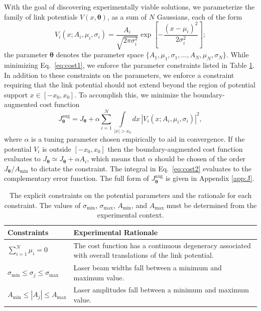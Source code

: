\documentclass[reprint, twocolumn,amsmath,amssymb,showpacs,pra,superscriptaddress,aps]{revtex4-1}
\begin{document}
With the goal of discovering experimentally viable solutions, we parameterize the family of link potentials $V(x, \bm{\theta})$, as a sum of $N$ Gaussians, each of the form
\begin{equation}\label{eq:V-param}
V_i(x; A_i, \mu_i, \sigma_i) = \frac{A_i}{\sqrt{2\pi\sigma_i^2}}\exp\left[{-\frac{(x-\mu_i)^2}{2\sigma_i^2}}\right];
\end{equation}
the parameter $\bm{\theta}$ denotes the parameter space $\{A_1, \mu_1, \sigma_1,...,A_N, \mu_N, \sigma_N\}$. While minimizing Eq.~\eqref{eq:cost1}, we enforce the parameter constraints listed in Table \ref{tab:constraints}. In addition to these constraints on the parameters, we enforce a constraint requiring that the link potential should not extend beyond the region of potential support $x\in[-x_0,x_0]$. 
To accomplish this, we minimize the boundary-augmented cost function
\begin{equation}\label{eq:cost2}
  J_{\bm{\theta}}^{\mathrm{aug}} = J_{\bm{\theta}} + \alpha \sum_{i=1}^N\int\limits_{|x|>x_0}dx\,|V_i(x; A_i,\mu_i,\sigma_i)|^2,
\end{equation}
where $\alpha$ is a tuning parameter chosen empirically to aid in convergence. 
 If the potential $V_i$ is outside $[-x_0,x_0]$ then the boundary-augmented 
cost function evaluates to $J_{\bm{\theta}}\simeq J_{\bm{\theta}} +\alpha A_i$, which means that $\alpha$
should be chosen of the order $J_{\bm{\theta}}/A_{\mathrm{min}}$ to dictate the constraint.
 The integral in Eq.~\eqref{eq:cost2} evaluates to the complementary error function. The full form of $J_{\bm{\theta}}^{\mathrm{aug}}$ is given in Appendix \ref{app:J}.

\begin{table}[t]
  \renewcommand*{\arraystretch}{1.4}
  \begin{tabular}{m{3cm}|m{5.5cm}}
    Constraints & Experimental Rationale \\
    \hline\hline
    $\sum_{i=1}^{N}\mu_i = 0$ & The cost function has a continuous degeneracy associated with overall translations of the link potential. \\
    \hline
    $\sigma_{\mathrm{min}} \leq \sigma_j \leq \sigma_{\mathrm{max}} $ & Laser beam widths fall between a minimum and maximum value.\\
    \hline
    $A_{\mathrm{min}} \leq |A_j| \leq A_{\mathrm{max}}$ & Laser amplitudes fall between a minimum and maximum value.
  \end{tabular}
  \caption{The explicit constraints on the potential parameters and the rationale for each constraint. The values of $\sigma_{\mathrm{min}}$, $\sigma_{\mathrm{max}}$, $A_{\mathrm{min}}$, and $A_{\mathrm{max}}$ must be determined from the experimental context.}
  \label{tab:constraints}
\end{table}
\end{document}
